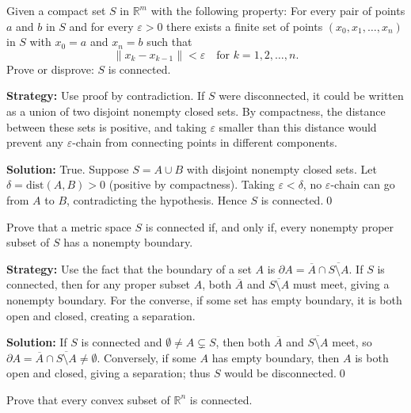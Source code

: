 \begin{problembox}
Given a compact set $S$ in $\mathbb{R}^m$ with the following property: For every pair of points $a$ and $b$ in $S$ and for every $\varepsilon > 0$ there exists a finite set of points $(x_0, x_1, \ldots, x_n)$ in $S$ with $x_0 = a$ and $x_n = b$ such that
\[\|x_k - x_{k-1}\| < \varepsilon \quad \text{for } k = 1, 2, \ldots, n.\]
Prove or disprove: $S$ is connected.
\end{problembox}

\noindent\textbf{Strategy:} Use proof by contradiction. If $S$ were disconnected, it could be written as a union of two disjoint nonempty closed sets. By compactness, the distance between these sets is positive, and taking $\varepsilon$ smaller than this distance would prevent any $\varepsilon$-chain from connecting points in different components.

\bigskip\noindent\textbf{Solution:}
True. Suppose $S=A\cup B$ with disjoint nonempty closed sets. Let $\delta=\mathrm{dist}(A,B)>0$ (positive by compactness). Taking $\varepsilon<\delta$, no $\varepsilon$-chain can go from $A$ to $B$, contradicting the hypothesis. Hence $S$ is connected.\qed



\begin{problembox}
Prove that a metric space $S$ is connected if, and only if, every nonempty proper subset of $S$ has a nonempty boundary.
\end{problembox}

\noindent\textbf{Strategy:} Use the fact that the boundary of a set $A$ is $\partial A = \overline{A} \cap \overline{S \setminus A}$. If $S$ is connected, then for any proper subset $A$, both $\overline{A}$ and $\overline{S \setminus A}$ must meet, giving a nonempty boundary. For the converse, if some set has empty boundary, it is both open and closed, creating a separation.

\bigskip\noindent\textbf{Solution:}
If $S$ is connected and $\emptyset\ne A\subsetneq S$, then both $\overline{A}$ and $\overline{S\setminus A}$ meet, so $\partial A=\overline{A}\cap\overline{S\setminus A}\ne\emptyset$. Conversely, if some $A$ has empty boundary, then $A$ is both open and closed, giving a separation; thus $S$ would be disconnected.\qed



\begin{problembox}
Prove that every convex subset of $\mathbb{R}^n$ is connected.
\end{problembox}

